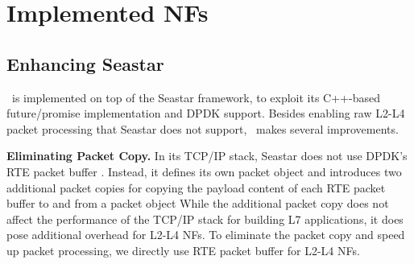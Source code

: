 \section{Implemented NFs}
\label{implementation}


\subsection{Enhancing Seastar}

\netstar~is implemented on top of the Seastar framework, to exploit its C++-based future/promise implementation and DPDK support.
 Besides enabling raw L2-L4 packet processing that Seastar does not support, \netstar~makes several improvements.

 \noindent\textbf{Eliminating Packet Copy.} In its TCP/IP stack, Seastar does not use DPDK's RTE packet buffer \cite{dpdk}. Instead, it defines its own packet object and introduces two additional packet copies for copying the payload content of each RTE packet buffer to and from a packet object %
  While the additional packet copy does not affect the performance of the TCP/IP stack for building L7 applications, it does pose additional overhead for L2-L4 NFs. To eliminate the packet copy and speed up packet processing, we directly use RTE packet buffer for L2-L4 NFs. %

